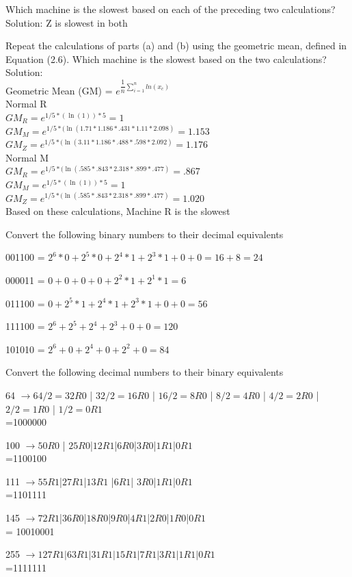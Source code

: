 \documentclass[12pt,largemargins]{homework}
\begin{document}
\begin{alphaparts}
\begin{center}
\end{center}
\item
Which machine is the slowest based on each of the preceding two calculations?\\
Solution: Z is slowest in both
\item 
Repeat the calculations of parts (a) and (b) using the geometric mean, defined in
Equation (2.6). Which machine is the slowest based on the two calculations?\\
Solution:\\
Geometric Mean (GM) = $e^{\dfrac{1}{n}\sum_{i=1}^{n} ln(x_c)}$\\
Normal R\\
$GM_R=e^{1/5*(\ln(1))*5} = 1$\\
$GM_M=e^{1/5*(\ln(1.71*1.186*.431*1.11*2.098)}=1.153$\\
$GM_Z=e^{1/5*(\ln(3.11*1.186*.488*.598*2.092)}=1.176$\\


Normal M\\
$GM_R=e^{1/5*(\ln(.585*.843*2.318*.899*.477)}=.867$\\
$GM_M=e^{1/5*(\ln(1))*5} = 1$\\
$GM_Z=e^{1/5*(\ln(.585*.843*2.318*.899*.477)}=1.020$\\
Based on these calculations, Machine R is the slowest\\
\end{alphaparts}
 Convert the following binary numbers to their decimal equivalents
\begin{alphaparts}
\item
001100 = $2^6*0+2^5*0+2^4*1+2^3*1 + 0 + 0 = 16+ 8 = 24$
\item
000011 = $ 0 + 0 + 0 +0 + 2^2*1 + 2^1 * 1 = 6$
\item
011100 = $ 0 + 2^5*1 + 2^4 *1 + 2^3*1 + 0 + 0=56$
\item
111100 = $ 2^6 + 2^5+2^4 + 2^3 + 0 + 0 = 120$
\item 
101010 = $2^6 + 0 + 2^4 + 0 + 2^2 + 0 = 84$
\end{alphaparts}
 Convert the following decimal numbers to their binary equivalents
\begin{alphaparts}
\item
64 $\rightarrow 64/2 = 32R0$ | $32/2=16R0$ | $16/2=8R0$ | $8/2=4R0$ | $4/2=2R0$ | $2/2= 1R0$ | $1/2=0R1$\\
=1000000\\
\item
100 $\rightarrow 50R0 $ | $25R0$|$12R1$|$6R0$|$3R0$|$1R1$|$0R1$\\
=1100100
\item
111 $\rightarrow 55R1$|$27R1$|$13R1 $ |$6R1$| $3R0$|$1R1$|$0R1$\\
=1101111 \\
\item
145 $\rightarrow 72R1$|$36R0$|$18R0$|$9R0$|$4R1$|$2R0$|$1R0$|$0R1$\\
= 10010001
\item
255 $\rightarrow 127R1|63R1|31R1|15R1|7R1|3R1|1R1|0R1$\\
=1111111
\end{alphaparts}
\end{document}
